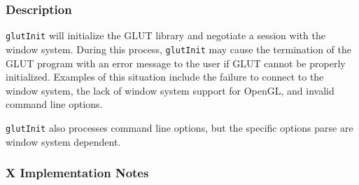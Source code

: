 \subsubsection*{Description}

{\tt glutInit} will initialize the GLUT library and negotiate a session with the window
system.  During this process, {\tt glutInit}
may cause the termination of the GLUT program with an error message to the user if GLUT
cannot be properly initialized.  Examples of this situation include the failure to
connect to the window system, the lack of window system support for OpenGL, and invalid
command line options.

{\tt glutInit} also processes command line options, but the specific options
parse are window system dependent.

\subsubsection*{X Implementation Notes}

